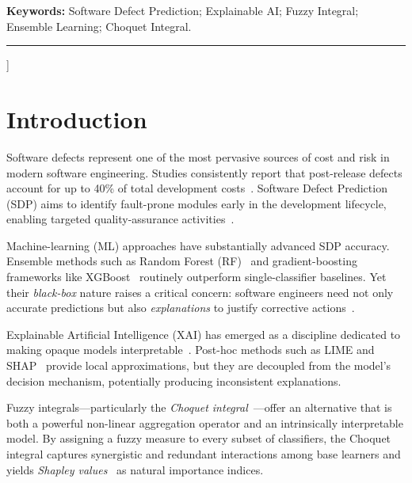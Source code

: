 \documentclass[10pt,twocolumn]{article}
\begin{document}
{\begin{@twocolumnfalse}
  \vspace{4pt}
  \noindent\textbf{Keywords:} Software Defect Prediction; Explainable AI; Fuzzy Integral; Ensemble
  Learning; Choquet Integral.
  \vspace{6pt}
  \hrule
  \vspace{10pt}
\end{@twocolumnfalse}
}]

\section{Introduction}

Software defects represent one of the most pervasive sources of cost and risk in modern software
engineering. Studies consistently report that post-release defects account for up to 40\% of total
development costs~\cite{jones2013economics}. Software Defect Prediction (SDP) aims to identify
fault-prone modules early in the development lifecycle, enabling targeted quality-assurance
activities~\cite{hall2012systematic}.

Machine-learning (ML) approaches have substantially advanced SDP accuracy. Ensemble methods such
as Random Forest (RF)~\cite{breiman2001random} and gradient-boosting frameworks like
XGBoost~\cite{chen2016xgboost} routinely outperform single-classifier baselines. Yet their
\emph{black-box} nature raises a critical concern: software engineers need not only accurate
predictions but also \emph{explanations} to justify corrective actions~\cite{wieringa2014design}.

Explainable Artificial Intelligence (XAI) has emerged as a discipline dedicated to making
opaque models interpretable~\cite{arrieta2020explainable}. Post-hoc methods such as LIME and
SHAP~\cite{lundberg2017unified} provide local approximations, but they are decoupled from the
model's decision mechanism, potentially producing inconsistent explanations.

Fuzzy integrals—particularly the \emph{Choquet integral}~\cite{choquet1954theory}—offer an
alternative that is both a powerful non-linear aggregation operator and an intrinsically
interpretable model. By assigning a fuzzy measure to every subset of classifiers, the Choquet
integral captures synergistic and redundant interactions among base learners and yields
\emph{Shapley values}~\cite{shapley1953value} as natural importance indices.
\end{document}
